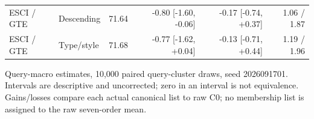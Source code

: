 \begin{table}[t]
\begin{tabular}{llrrrr}
ESCI / GTE & Descending & 71.64 & -0.80 [-1.60, -0.06] & -0.17 [-0.74, +0.37] & 1.06 / 1.87 \\
ESCI / GTE & Type/style & 71.68 & -0.77 [-1.62, +0.04] & -0.13 [-0.71, +0.44] & 1.19 / 1.96 \\
\bottomrule
\end{tabular}
\par\smallskip\begin{minipage}{\linewidth}\small Query-macro estimates, 10,000 paired query-cluster draws, seed 2026091701. Intervals are descriptive and uncorrected; zero in an interval is not equivalence. Gains/losses compare each actual canonical list to raw C0; no membership list is assigned to the raw seven-order mean.\end{minipage}
\end{table}

